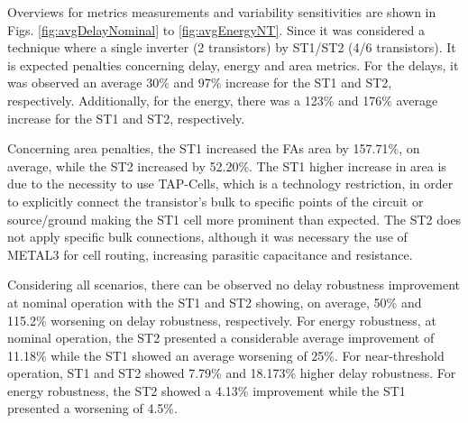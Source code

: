 \documentclass[pgmicro,mestrado,english]{iiufrgs}
\begin{document}
Overviews for metrics measurements and variability sensitivities are shown in Figs. \ref{fig:avgDelayNominal} to \ref{fig:avgEnergyNT}. Since it was considered a technique where a single inverter (2 transistors) by ST1/ST2 (4/6 transistors). It is expected penalties concerning delay, energy and area metrics. For the delays, it was observed an average 30\% and 97\% increase for the ST1 and ST2, respectively. Additionally, for the energy, there was a 123\% and 176\% average increase for the ST1 and ST2, respectively.

Concerning area penalties, the ST1 increased the FAs area by 157.71\%, on average, while the ST2 increased by 52.20\%. The ST1 higher increase in area is due to the necessity to use TAP-Cells, which is a technology restriction, in order to explicitly connect the transistor's bulk to specific points of the circuit or source/ground making the ST1 cell more prominent than expected. The ST2 does not apply specific bulk connections, although it was necessary the use of METAL3 for cell routing, increasing parasitic capacitance and resistance. 

Considering all scenarios, there can be observed no delay robustness improvement at nominal operation with the ST1 and ST2 showing, on average, 50\% and 115.2\% worsening on delay robustness, respectively. For energy robustness, at nominal operation, the ST2 presented a considerable average improvement of 11.18\% while the ST1 showed an average worsening of 25\%. For near-threshold operation, ST1 and ST2 showed 7.79\% and 18.173\% higher delay robustness. For energy robustness, the ST2 showed a 4.13\% improvement while the ST1 presented a worsening of 4.5\%. 

\end{document}
